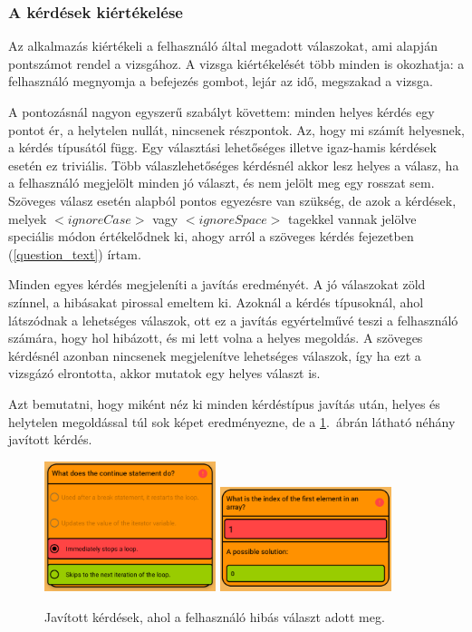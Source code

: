 \documentclass[12pt,a4paper]{article}
\begin{document}
	\subsubsection{A kérdések kiértékelése}
	
	Az alkalmazás kiértékeli a felhasználó által megadott válaszokat, ami alapján pontszámot rendel a vizsgához. A vizsga kiértékelését több minden is okozhatja: a felhasználó megnyomja a befejezés gombot, lejár az idő, megszakad a vizsga.
	
	A pontozásnál nagyon egyszerű szabályt követtem: minden helyes kérdés egy pontot ér, a helytelen nullát, nincsenek részpontok. Az, hogy mi számít helyesnek, a kérdés típusától függ. Egy választási lehetőséges illetve igaz-hamis kérdések esetén ez triviális. Több válaszlehetőséges kérdésnél akkor lesz helyes a válasz, ha a felhasználó megjelölt minden jó választ, és nem jelölt meg egy rosszat sem. Szöveges válasz esetén alapból pontos egyezésre van szükség, de azok a kérdések, melyek $<ignoreCase>$ vagy $<ignoreSpace>$ tagekkel vannak jelölve speciális módon értékelődnek ki, ahogy arról a szöveges kérdés fejezetben (\ref{question_text}) írtam.
	
	Minden egyes kérdés megjeleníti a javítás eredményét. A jó válaszokat zöld színnel, a hibásakat pirossal emeltem ki. Azoknál a kérdés típusoknál, ahol látszódnak a lehetséges válaszok, ott ez a javítás egyértelművé teszi a felhasználó számára, hogy hol hibázott, és mi lett volna a helyes megoldás. A szöveges kérdésnél azonban nincsenek megjelenítve lehetséges válaszok, így ha ezt a vizsgázó elrontotta, akkor mutatok egy helyes választ is.
	
	Azt bemutatni, hogy miként néz ki minden kérdéstípus javítás után, helyes és helytelen megoldással túl sok képet eredményezne, de a \ref{corrected_questions}.\ ábrán látható néhány javított kérdés.
	
	\begin{figure}[h!]
		\centering
		\includegraphics[width=5cm]{corrected_question_1}
		\includegraphics[width=5cm]{corrected_question_2}
		\caption{Javított kérdések, ahol a felhasználó hibás választ adott meg.}
		\label{corrected_questions}
	\end{figure}
	
\end{document}
